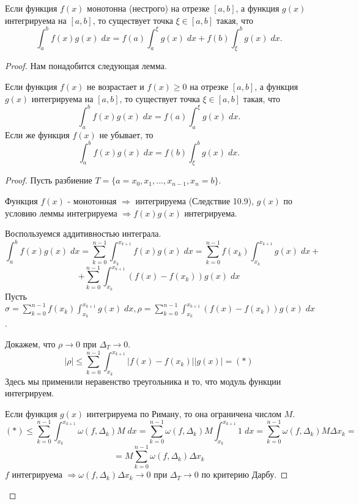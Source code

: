     \begin{theorem}
    	Если функция $f(x)$ монотонна (нестрого) на отрезке $[a, b]$, а
    	функция $g(x)$ интегрируема на $[a, b]$, то существует точка
    	$\xi \in [a, b]$ такая, что
    	\[ \int_a^b f(x)g(x) \; dx = f(a) \int_a^{\xi} g(x) \; dx + f(b) \int_{\xi}^b g(x) \; dx. \]
    \end{theorem}
    
    \begin{proof}
    	Нам понадобится следующая лемма.
    
    \begin{lemma}
    	Если функция $f(x)$ не возрастает и $f(x) \geqslant 0$ на отрезке $[a, b]$, а функция $g(x)$ интегрируема на $[a, b]$, то существует точка $\xi \in [a, b]$ такая, что
    	\[ \int_a^b f(x)g(x) \; dx = f(a) \int_a^{\xi} g(x) \; dx. \]
    	Если же функция $f(x)$ не убывает, то
    	\[ \int_a^b f(x)g(x) \; dx = f(b) \int_{\xi}^b g(x) \; dx. \]
    \end{lemma}
    
    \begin{proof}
	    Пусть разбиение $T = \{a = x_0, x_1, ..., x_{n - 1}, x_n = b\}$.
	    
	    Функция $f(x)$ - монотонная $\Rightarrow$ интегрируема (Следствие 10.9), $g(x)$ по условию леммы интегрируема $\Rightarrow f(x)g(x)$ интегрируема.
	    
	    Воспользуемся аддитивностью интеграла.
	    \[ \int_a^b f(x)g(x) \; dx = \sum_{k = 0}^{n - 1} \int_{x_k}^{x_{k + 1}} f(x)g(x) \; dx = \sum_{k = 0}^{n - 1} f(x_k) \int_{x_k}^{x_{k + 1}} g(x) \; dx + \]
	    \[ + \sum_{k = 0}^{n - 1} \int_{x_k}^{x_{k + 1}} (f(x) - f(x_k)) g(x) \; dx \]
	    Пусть $\sigma = \sum_{k = 0}^{n - 1} f(x_k) \int_{x_k}^{x_{k + 1}} g(x) \; dx, \rho = \sum_{k = 0}^{n - 1} \int_{x_k}^{x_{k + 1}} (f(x) - f(x_k)) g(x) \; dx$.
	    
	    Докажем, что $\rho \to 0$ при $\Delta_T \to 0$.
	    \[ |\rho| \leqslant \sum_{k = 0}^{n - 1} \int_{x_k}^{x_{k + 1}} |f(x) - f(x_k)| |g(x)| = (*) \]	    
	    Здесь мы применили неравенство треугольника и то, что модуль функции интегрируем.
	    
	    Если функция $g(x)$ интегрируема по Риману, то она ограничена числом $M$.
	    \[ (*) \leqslant \sum_{k = 0}^{n - 1} \int_{x_k}^{x_{k + 1}} \omega(f, \Delta_k) M \; dx = \sum_{k = 0}^{n - 1} \omega(f, \Delta_k) M \int_{x_k}^{x_{k + 1}} 1 \; dx =  \sum_{k = 0}^{n - 1} \omega(f, \Delta_k) M \Delta x_k = \] 
	    \[ = M \sum_{k = 0}^{n - 1} \omega(f, \Delta_k) \Delta x_k \]
	    $f$ интегрируема $\Rightarrow \omega(f, \Delta_k) \Delta x_k \to 0$ при $\Delta_T \to 0$ по критерию Дарбу.
	    

\end{proof}
\end{proof}
